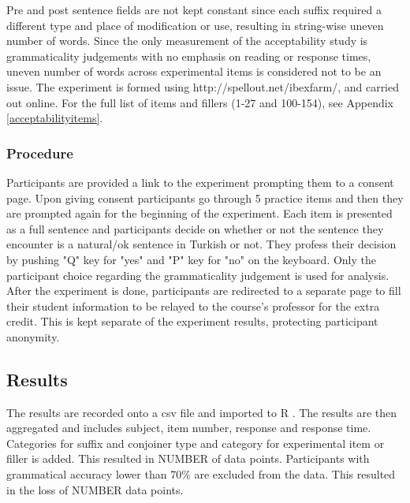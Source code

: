 Pre and post sentence fields are not kept constant since each suffix required a different type and place of modification or use, resulting in string-wise uneven number of words. Since the only measurement of the acceptability study is grammaticality judgements with no emphasis on reading or response times, uneven number of words across experimental items is considered not to be an issue. The experiment is formed using http://spellout.net/ibexfarm/, and carried out online. For the full list of items and fillers (1-27 and 100-154), see Appendix \ref{acceptabilityitems}.

\subsubsection{Procedure}
Participants are provided a link to the experiment prompting them to a consent page. Upon giving consent participants go through 5 practice items and then they are prompted again for the beginning of the experiment. Each item is presented as a full sentence and participants decide on whether or not the sentence they encounter is a natural/ok sentence in Turkish or not. They profess their decision by pushing "Q" key for "yes" and "P" key for "no" on the keyboard. Only the participant choice regarding the grammaticality judgement is used for analysis. After the experiment is done, participants are redirected to a separate page to fill their student information to be relayed to the course's professor for the extra credit. This is kept separate of the experiment results, protecting participant anonymity.

\subsection{Results}

The results are recorded onto a csv file and imported to R \citep{team2013r}. The results are then aggregated and includes subject, item number, response and response time. Categories for suffix and conjoiner type and category for experimental item or filler is added. This resulted in NUMBER of data points. Participants with grammatical accuracy lower than 70\% are excluded from the data. This resulted in the loss of NUMBER data points.


